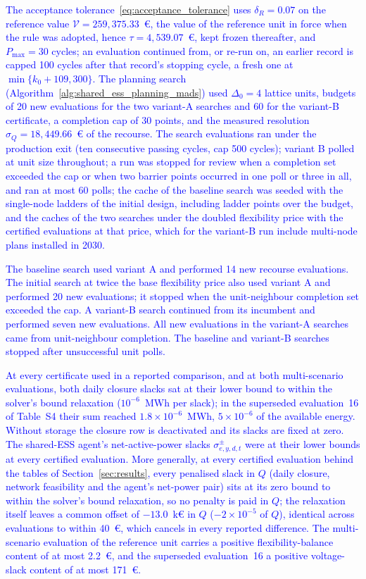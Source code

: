 \documentclass[preprint,12pt]{elsarticle}
\begin{document}
\textcolor{blue}{
    The acceptance tolerance~\eqref{eq:acceptance_tolerance} uses $\delta_R = 0.07$ on the reference value $\mathcal{V} = 259{,}375.33$~\euro{}, the value of the reference unit in force when the rule was adopted, hence $\tau = 4{,}539.07$~\euro{}, kept frozen thereafter, and $P_{\max} = 30$ cycles;
    an evaluation continued from, or re-run on, an earlier record is capped 100 cycles after that record's stopping cycle, a fresh one at $\min\{k_0 + 109, 300\}$. The planning search (Algorithm~\ref{alg:shared_ess_planning_mads}) used $\Delta_0 = 4$ lattice units, budgets of 20 new evaluations for the two variant-A searches and 60 for the variant-B certificate, a completion cap of 30 points, and the measured resolution $\sigma_Q = 18{,}449.66$~\euro{} of the recourse.
    The search evaluations ran under the production exit (ten consecutive passing cycles, cap 500 cycles); variant B polled at unit size throughout; a run was stopped for review when a completion set exceeded the cap or when two barrier points occurred in one poll or three in all, and ran at most 60 polls; the cache of the baseline search was seeded with the single-node ladders of the initial design, including ladder points over the budget, and the caches of the two searches under the doubled flexibility price with the certified evaluations at that price, which for the variant-B run include multi-node plans installed in 2030.
}

\textcolor{blue}{
    The baseline search used variant A and performed 14 new recourse evaluations. The initial search at twice the base flexibility price also used variant A and performed 20 new evaluations; it stopped when the unit-neighbour completion set exceeded the cap. A variant-B search continued from its incumbent and performed seven new evaluations. All new evaluations in the variant-A searches came from unit-neighbour completion. The baseline and variant-B searches stopped after unsuccessful unit polls.
}

\textcolor{blue}{
    At every certificate used in a reported comparison, and at both multi-scenario evaluations, both daily closure slacks sat at their lower bound to within the solver's bound relaxation ($10^{-6}$~MWh per slack); in the superseded evaluation~16 of Table~S4 their sum reached $1.8 \times 10^{-6}$~MWh, $5 \times 10^{-6}$ of the available energy. Without storage the closure row is deactivated and its slacks are fixed at zero.
    The shared-ESS agent's net-active-power slacks $\sigma^\pm_{e,y,d,t}$ were at their lower bounds at every certified evaluation.
    More generally, at every certified evaluation behind the tables of Section~\ref{sec:results}, every penalised slack in $Q$ (daily closure, network feasibility and the agent's net-power pair) sits at its zero bound to within the solver's bound relaxation, so no penalty is paid in $Q$; the relaxation itself leaves a common offset of $-13.0$~k\euro{} in $Q$ ($-2 \times 10^{-5}$ of $Q$), identical across evaluations to within 40~\euro{}, which cancels in every reported difference. The multi-scenario evaluation of the reference unit carries a positive flexibility-balance content of at most 2.2~\euro{}, and the superseded evaluation~16 a positive voltage-slack content of at most 171~\euro{}.
}
\end{document}
